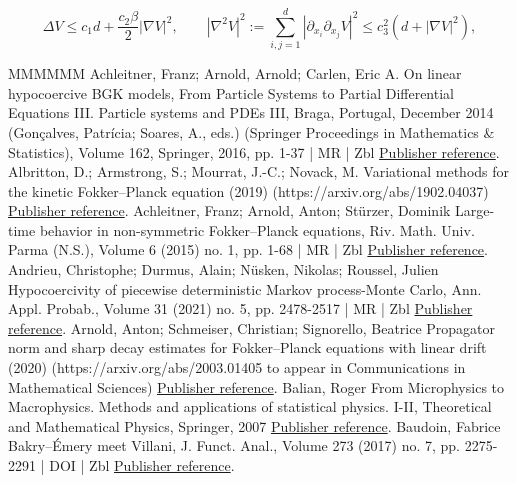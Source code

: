 \documentclass[10pt,a4paper]{article}
\numberwithin{equation}{section}
\renewcommand{\leq}{\leqslant}
\begin{document}
\begin{equation}\label{eq:regularization condition}
\Delta V \leq c_1 d + \frac {c_2 \beta} 2 \left| \nabla V \right|^2, \qquad \left|\nabla^2 V \right|^2 := \sum_{i,j=1}^d \left|\partial_{x_i}\partial_{x_j}V\right|^2 \leq c_3^2 \left(d + \left| \nabla V \right|^2 \right),
\end{equation}

\begin{thebibliography}{MMMMMM}
 Achleitner, Franz; Arnold, Arnold; Carlen, Eric A. On linear hypocoercive BGK models, From Particle Systems to Partial Differential Equations III. Particle systems and PDEs III, Braga, Portugal, December 2014 (Gonçalves, Patrícia; Soares, A., eds.) (Springer Proceedings in Mathematics \& Statistics), Volume 162, Springer, 2016, pp. 1-37 | MR | Zbl \href{https://ahl.centre-mersenne.org/item/AHL_2022__5__523_0/#AAC16}{Publisher reference}.
 Albritton, D.; Armstrong, S.; Mourrat, J.-C.; Novack, M. Variational methods for the kinetic Fokker–Planck equation (2019) (https://arxiv.org/abs/1902.04037) \href{https://ahl.centre-mersenne.org/item/AHL_2022__5__523_0/#AM19}{Publisher reference}.
 Achleitner, Franz; Arnold, Anton; Stürzer, Dominik Large-time behavior in non-symmetric Fokker–Planck equations, Riv. Math. Univ. Parma (N.S.), Volume 6 (2015) no. 1, pp. 1-68 | MR | Zbl \href{https://ahl.centre-mersenne.org/item/AHL_2022__5__523_0/#AAS15}{Publisher reference}.
 Andrieu, Christophe; Durmus, Alain; Nüsken, Nikolas; Roussel, Julien Hypocoercivity of piecewise deterministic Markov process-Monte Carlo, Ann. Appl. Probab., Volume 31 (2021) no. 5, pp. 2478-2517 | MR | Zbl \href{https://ahl.centre-mersenne.org/item/AHL_2022__5__523_0/#ADNR18}{Publisher reference}.
 Arnold, Anton; Schmeiser, Christian; Signorello, Beatrice Propagator norm and sharp decay estimates for Fokker–Planck equations with linear drift (2020) (https://arxiv.org/abs/2003.01405 to appear in Communications in Mathematical Sciences) \href{https://ahl.centre-mersenne.org/item/AHL_2022__5__523_0/#ASS20}{Publisher reference}.
 Balian, Roger From Microphysics to Macrophysics. Methods and applications of statistical physics. I-II, Theoretical and Mathematical Physics, Springer, 2007 \href{https://ahl.centre-mersenne.org/item/AHL_2022__5__523_0/#Balian}{Publisher reference}.
 Baudoin, Fabrice Bakry–Émery meet Villani, J. Funct. Anal., Volume 273 (2017) no. 7, pp. 2275-2291 | DOI | Zbl \href{https://ahl.centre-mersenne.org/item/AHL_2022__5__523_0/#Baudoin17}{Publisher reference}.

\end{thebibliography}
\end{document}
